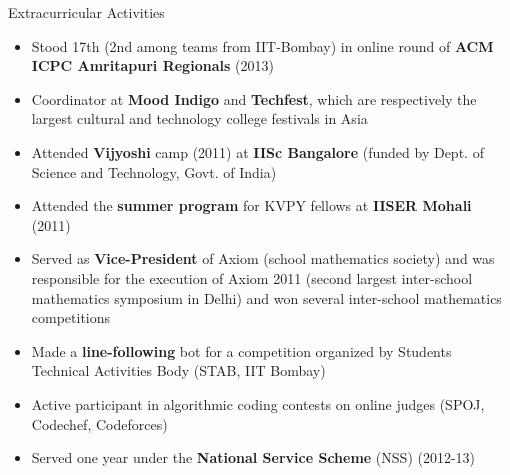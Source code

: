 \documentclass{resume2} %
\begin{document}
\begin{rSection}{Extracurricular Activities}
\begin{itemize}[leftmargin=*]
\item Stood 17th (2nd among teams from IIT-Bombay) in online round of \textbf{ACM ICPC Amritapuri Regionals} (2013)
\item Coordinator at \textbf{Mood Indigo} and \textbf{Techfest}, which are respectively the largest cultural and technology college festivals in Asia 
\item Attended \textbf{Vijyoshi} camp (2011) at \textbf{IISc Bangalore} (funded by Dept. of Science and Technology, Govt. of India)
\item Attended the \textbf{summer program} for KVPY fellows at \textbf{IISER Mohali} (2011)
\item Served as \textbf{Vice-President} of Axiom (school mathematics society) and was responsible for the execution of Axiom 2011 (second largest inter-school mathematics symposium in Delhi) and won several inter-school mathematics competitions
\item Made a \textbf{line-following} bot for a competition organized by Students Technical Activities Body (STAB, IIT Bombay)
\item Active participant in algorithmic coding contests on online judges (SPOJ, Codechef, Codeforces)
\item Served one year under the \textbf{National Service Scheme} (NSS) (2012-13)
\end{itemize}
\end{rSection}
\end{document}
